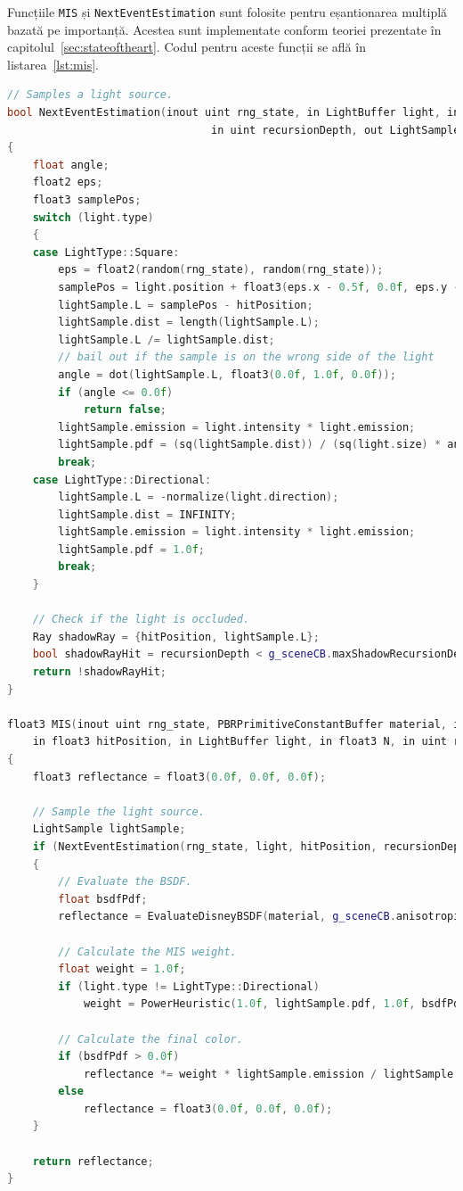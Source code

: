 \documentclass[12pt,a4paper]{report}
\numberwithin{equation}{section} %
\begin{document}
Funcțiile \texttt{MIS} și \texttt{NextEventEstimation} sunt folosite pentru eșantionarea
multiplă bazată pe importanță. Acestea sunt implementate conform teoriei prezentate în
capitolul~\ref{sec:stateoftheart}. Codul pentru aceste funcții se află în listarea~\ref{lst:mis}.
\begin{lstlisting}[caption={Funcțiile de eșantionare multiplă bazată pe importanță},label={lst:mis},language=C++]
// Samples a light source.
bool NextEventEstimation(inout uint rng_state, in LightBuffer light, in float3 hitPosition,
								in uint recursionDepth, out LightSample lightSample)
{
	float angle;
	float2 eps;
	float3 samplePos;
	switch (light.type)
	{
	case LightType::Square:
		eps = float2(random(rng_state), random(rng_state));
		samplePos = light.position + float3(eps.x - 0.5f, 0.0f, eps.y - 0.5f) * light.size;
		lightSample.L = samplePos - hitPosition;
		lightSample.dist = length(lightSample.L);
		lightSample.L /= lightSample.dist;
		// bail out if the sample is on the wrong side of the light
		angle = dot(lightSample.L, float3(0.0f, 1.0f, 0.0f));
		if (angle <= 0.0f)
			return false;
		lightSample.emission = light.intensity * light.emission;
		lightSample.pdf = (sq(lightSample.dist)) / (sq(light.size) * angle);
		break;
	case LightType::Directional:
		lightSample.L = -normalize(light.direction);
		lightSample.dist = INFINITY;
		lightSample.emission = light.intensity * light.emission;
		lightSample.pdf = 1.0f;
		break;
	}

	// Check if the light is occluded.
	Ray shadowRay = {hitPosition, lightSample.L};
	bool shadowRayHit = recursionDepth < g_sceneCB.maxShadowRecursionDepth && TraceShadowRayAndReportIfHit(shadowRay, recursionDepth);
	return !shadowRayHit;
}

float3 MIS(inout uint rng_state, PBRPrimitiveConstantBuffer material, in float eta,
	in float3 hitPosition, in LightBuffer light, in float3 N, in uint recursionDepth)
{
	float3 reflectance = float3(0.0f, 0.0f, 0.0f);

	// Sample the light source.
	LightSample lightSample;
	if (NextEventEstimation(rng_state, light, hitPosition, recursionDepth, lightSample))
	{
		// Evaluate the BSDF.
		float bsdfPdf;
		reflectance = EvaluateDisneyBSDF(material, g_sceneCB.anisotropicBSDF, eta, -WorldRayDirection(), lightSample.L, N, bsdfPdf);

		// Calculate the MIS weight.
		float weight = 1.0f;
		if (light.type != LightType::Directional)
			weight = PowerHeuristic(1.0f, lightSample.pdf, 1.0f, bsdfPdf);

		// Calculate the final color.
		if (bsdfPdf > 0.0f)
			reflectance *= weight * lightSample.emission / lightSample.pdf;
		else
			reflectance = float3(0.0f, 0.0f, 0.0f);
	}

	return reflectance;
}
\end{lstlisting}
\end{document}
